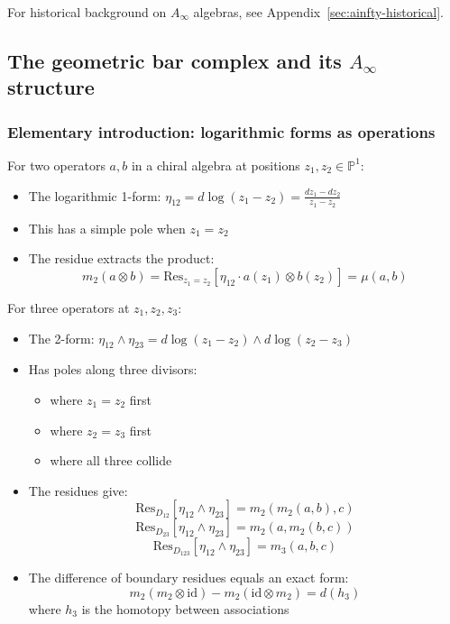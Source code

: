 For historical background on $A_\infty$ algebras, see Appendix~\ref{sec:ainfty-historical}.


\subsection{\texorpdfstring{The geometric bar complex and its $A_\infty$ structure}{The geometric bar complex and its A-infinity structure}}

\subsubsection{Elementary introduction: logarithmic forms as operations}

\begin{example}
For two operators $a, b$ in a chiral algebra at positions $z_1, z_2 \in \mathbb{P}^1$:
\begin{itemize}
\item The logarithmic 1-form: $\eta_{12} = d\log(z_1 - z_2) = \frac{dz_1 - dz_2}{z_1 - z_2}$
\item This has a simple pole when $z_1 = z_2$
\item The residue extracts the product:
\[m_2(a \otimes b) = \text{Res}_{z_1=z_2}\left[\eta_{12} \cdot a(z_1) \otimes b(z_2)\right] = \mu(a,b)\]
\end{itemize}
\end{example}

\begin{example}
For three operators at $z_1, z_2, z_3$:
\begin{itemize}
\item The 2-form: $\eta_{12} \wedge \eta_{23} = d\log(z_1-z_2) \wedge d\log(z_2-z_3)$
\item Has poles along three divisors:
 \begin{itemize}
 \item[$D_{12}$:] where $z_1 = z_2$ first
 \item[$D_{23}$:] where $z_2 = z_3$ first
 \item[$D_{123}$:] where all three collide
 \end{itemize}
\item The residues give:
\[\text{Res}_{D_{12}}[\eta_{12} \wedge \eta_{23}] = m_2(m_2(a,b),c)\]
\[\text{Res}_{D_{23}}[\eta_{12} \wedge \eta_{23}] = m_2(a,m_2(b,c))\]
\[\text{Res}_{D_{123}}[\eta_{12} \wedge \eta_{23}] = m_3(a,b,c)\]
\item The difference of boundary residues equals an exact form:
\[m_2(m_2 \otimes \text{id}) - m_2(\text{id} \otimes m_2) = d(h_3)\]
where $h_3$ is the homotopy between associations
\end{itemize}
\end{example}

